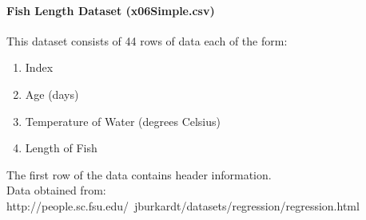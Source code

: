 \documentclass[12pt]{article}
\begin{document}
\paragraph{Fish Length Dataset  (x06Simple.csv)}
This dataset consists of 44 rows of data each of the form:
\begin{enumerate}
\item Index
\item Age (days)
\item Temperature of Water (degrees Celsius)
\item Length of Fish
\end{enumerate}
The first row of the data contains header information.\\

\noindent
Data obtained from:  http://people.sc.fsu.edu/~jburkardt/datasets/regression/regression.html

\newpage
\end{document}
